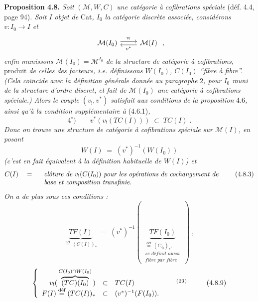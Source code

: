 \documentclass[11pt]{article}
\newcommand{\printedpage}[1]{\marginpar{\footnotesize p.~#1}}
\newcommand{\msp}[1]{\marginpar{\footnotesize [#1]}}
\newcommand{\defeq}{\overset{\text{déf}}{=}}
\newcommand{\fnm}[1]{\textsuperscript{(}\footnotemark[#1]\textsuperscript{)}}
\begin{document}
\textbf{Proposition 4.8.} \textit{Soit} $(\mathcal{M}, W, C)$ \textit{une catégorie à cofibrations spéciale} (déf. 4.4, page 94)\textit{. Soit $I$ objet de} Cat\textit{, $I_0$ la catégorie discrète associée, considérons $v : I_0 \longrightarrow I$ et} %
\printedpage{40}
\[
\begin{tikzcd}
\mathcal{M}(I_0) \arrow[r, shift left, "v_{!}"] & \mathcal{M}(I) \arrow[l, shift left, "v^{*}"]
\end{tikzcd} \; ,
\]
\textit{enfin munissons $\mathcal{M}(I_0) = \mathcal{M}^{I_0}$ de la structure de catégorie à cofibrations,} produit \textit{de celles des facteurs, i.e. définissons $W(I_0)$, $C(I_0)$ “fibre à fibre”. (Cela coïncide avec la définition générale donnée au paragraphe} 2\textit{, pour $I_0$ muni de la structure d'ordre discret, et fait de $\mathcal{M}(I_0)$ une catégorie à cofibrations spéciale.) Alors le couple $(v_{!}, v^{*})$ satisfait} \msp{page 82} \textit{aux conditions de la proposition} 4.6\textit{, ainsi qu'à la condition supplémentaire à} (4.6.1)\textit{,}
\[
4^{\circ}) \qquad v^{*}(v_{!}(TC(I))) \;\subset\; TC(I) \; .
\tag*{(4.8.1)}
\]
\textit{Donc on trouve une structure de catégorie à cofibrations spéciale sur $\mathcal{M}(I)$, en posant}
\[
W(I) \;=\; (v^{*})^{-1}(W(I_0))
\tag*{(4.8.2)}
\]
\textit{(c'est en fait équivalent à la définition habituelle de $W(I)$) et}
\[
C(I) \quad = \quad
\begin{array}[t]{l}
\textit{clôture de } v_{!}(C(I_0)) \textit{ pour les opérations de cochangement de}\\
\textit{base et composition transfinie.}
\end{array}
\tag*{(4.8.3)}
\]
\textit{On a de plus sous ces conditions :}
\[
\underbrace{TF(I)}_{\defeq\,(C(I))_{*}} \;=\; (v^{*})^{-1}( \; \underbrace{TF(I_0)}_{\substack{\defeq\,(C_{I_0})_{*},\\ \textit{se définit aussi}\\ \textit{fibre par fibre}}} \; ) \; ,
\tag*{(4.8.8)}
\]
\[
\left\{
\begin{array}{rcl}
v_{!}( \, \overbrace{(TC)(I_0)}^{C(I_0)\cap W(I_0)} \, ) & \subset & TC(I) \qquad\qquad\qquad \text{\fnm{23}} \\
F(I) \defeq (TC(I))_{*} & \subset & (v^{*})^{-1}(F(I_0)).
\end{array}
\right.
\tag*{(4.8.9)}
\]
\end{document}
